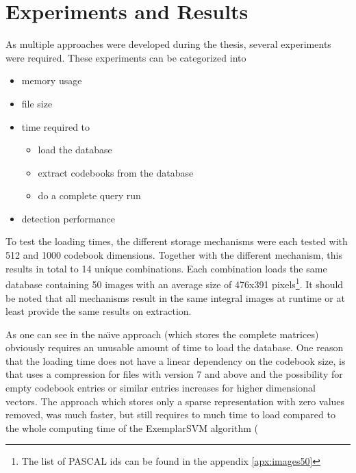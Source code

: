 \chapter{Experiments and Results}
\label{cha:experiments}

As multiple approaches were developed during the thesis, several experiments were required. These experiments can be categorized into 

\begin{itemize}
\item memory usage
\item file size
\item time required to
    \begin{itemize}
    \item load the database
    \item extract codebooks from the database
    \item do a complete query run
    \end{itemize}
\item detection performance
\end{itemize}

To test the loading times, the different storage mechanisms were each tested with 512 and 1000 codebook dimensions. Together with the different mechanism, this results in total to 14 unique combinations. Each combination loads the same database containing 50 images with an average size of 476x391 pixels\footnote{The list of PASCAL ids can be found in the appendix \ref{apx:images50}}. It should be noted that all mechanisms result in the same integral images at runtime or at least provide the same results on extraction.

As one can see in  the na\"{\i}ve approach (which stores the complete matrices) obviously requires an unusable amount of time to load the database. One reason that the loading time does not have a linear dependency on the codebook size, is that \MATLAB uses a compression for files with version 7 and above and the possibility for empty codebook entries or similar entries increases for higher dimensional vectors. The approach which stores only a sparse representation with zero values removed, was much faster, but still requires to much time to load compared to the whole computing time of the ExemplarSVM algorithm (%

